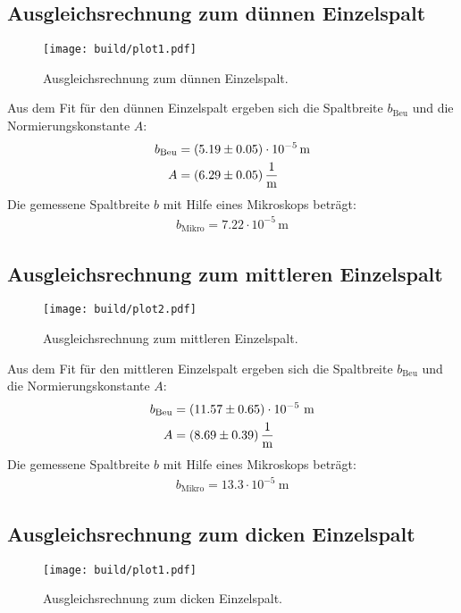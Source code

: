\subsection{Ausgleichsrechnung zum dünnen Einzelspalt}
\begin{figure}[H] %
  \centering
  \texttt{[image: build/plot1.pdf]}
  \caption{Ausgleichsrechnung zum dünnen Einzelspalt.}
  \label{fig:Einzel1}
\end{figure}
Aus dem Fit für den dünnen Einzelspalt ergeben sich die Spaltbreite $b_\text{Beu}$ und die Normierungskonstante $A$:
\begin{align*}
  b_\text{Beu} & = (\num{5.19 +- 0.05}) \cdot 10^{-5} \, \text{m} \\
  A & = (\num{6.29 +- 0.05}) \, \frac{1}{\text{m}}
\end{align*}
Die gemessene Spaltbreite $b$ mit Hilfe eines Mikroskops beträgt:
\begin{align*}
  b_\text{Mikro} = 7.22 \cdot 10^{-5} \, \text{m}
\end{align*}


\subsection{Ausgleichsrechnung zum mittleren Einzelspalt}
\begin{figure}[H] %
  \centering
  \texttt{[image: build/plot2.pdf]}
  \caption{Ausgleichsrechnung zum mittleren Einzelspalt.}
  \label{fig:Einzel2}
\end{figure}

Aus dem Fit für den mittleren Einzelspalt ergeben sich die Spaltbreite $b_\text{Beu}$ und die Normierungskonstante $A$:
\begin{align*}
  b_\text{Beu} & = (\num{11.57 +- 0.65}) \cdot 10^{-5} \ \text{m} \\
  A & = (\num{8.69 +- 0.39}) \, \frac{1}{\text{m}}
\end{align*}
Die gemessene Spaltbreite $b$ mit Hilfe eines Mikroskops beträgt:
\begin{align*}
  b_\text{Mikro} = 13.3 \cdot 10^{-5} \ \text{m}
\end{align*}

\subsection{Ausgleichsrechnung zum dicken Einzelspalt}
\begin{figure}[H] %
  \centering
  \texttt{[image: build/plot1.pdf]}
  \caption{Ausgleichsrechnung zum dicken Einzelspalt.}
  \label{fig:Einzel3}
\end{figure}

